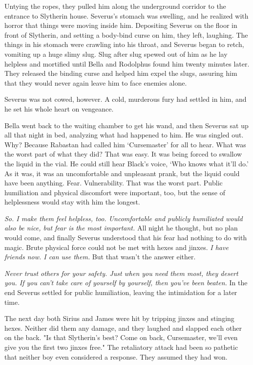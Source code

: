 \documentclass[a4paper,11pt]{article}
\begin{document}
Untying the ropes, they pulled him along the underground corridor to the entrance to Slytherin house. Severus's stomach was swelling, and he realized with horror that things were moving inside him. Depositing Severus on the floor in front of Slytherin, and setting a body-bind curse on him, they left, laughing. The things in his stomach were crawling into his throat, and Severus began to retch, vomiting up a huge slimy slug. Slug after slug spewed out of him as he lay helpless and mortified until Bella and Rodolphus found him twenty minutes later. They released the binding curse and helped him expel the slugs, assuring him that they would never again leave him to face enemies alone.

Severus was not cowed, however. A cold, murderous fury had settled in him, and he set his whole heart on vengeance.

Bella went back to the waiting chamber to get his wand, and then Severus sat up all that night in bed, analyzing what had happened to him. He was singled out. Why? Because Rabastan had called him `Cursemaster' for all to hear. What was the worst part of what they did? That was easy. It was being forced to swallow the liquid in the vial. He could still hear Black's voice, `Who knows what it'll do.' As it was, it was an uncomfortable and unpleasant prank, but the liquid could have been anything. Fear. Vulnerability. That was the worst part. Public humiliation and physical discomfort were important, too, but the sense of helplessness would stay with him the longest.

\emph{So. I make them feel helpless, too. Uncomfortable and publicly humiliated would also be nice, but fear is the most important.} All night he thought, but no plan would come, and finally Severus understood that his fear had nothing to do with magic. Brute physical force could not be met with hexes and jinxes. \emph{I have friends now. I can use them.} But that wasn't the answer either.

\emph{Never trust others for your safety. Just when you need them most, they desert you. If you can't take care of yourself by yourself, then you've been beaten.} In the end Severus settled for public humiliation, leaving the intimidation for a later time.

The next day both Sirius and James were hit by tripping jinxes and stinging hexes. Neither did them any damage, and they laughed and slapped each other on the back. "Is that Slytherin's best? Come on back, Cursemaster, we'll even give you the first two jinxes free." The retaliatory attack had been so pathetic that neither boy even considered a response. They assumed they had won.
\end{document}

